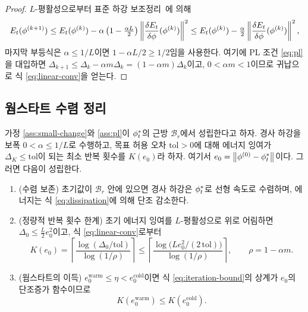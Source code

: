 \begin{proof}
$L$-평활성으로부터 표준 하강 보조정리~\citep[Lemma 1.2.3]{nesterov2004_introductory}에
의해
\[
  E_t(\phi^{(k+1)}) \le E_t(\phi^{(k)})
  - \alpha\left(1-\tfrac{\alpha L}{2}\right)\left\lVert \frac{\delta E_t}{\delta\phi}(\phi^{(k)}) \right\rVert^2
  \le E_t(\phi^{(k)}) - \tfrac{\alpha}{2}\left\lVert \frac{\delta E_t}{\delta\phi}(\phi^{(k)}) \right\rVert^2,
\]
마지막 부등식은 $\alpha\le 1/L$이면 $1-\alpha L/2 \ge 1/2$임을 사용한다. 여기에 PL
조건 \eqref{eq:pl}을 대입하면
$\Delta_{k+1} \le \Delta_k - \alpha m \Delta_k = (1-\alpha m)\Delta_k$이고,
$0<\alpha m<1$이므로 귀납으로 식 \eqref{eq:linear-conv}을 얻는다.
\end{proof}

\subsection{웜스타트 수렴 정리}

\begin{theorem}
\label{thm:warmstart}
가정 \ref{ass:small-change}와 \ref{ass:pl}이 $\phi^*_t$의 근방 $\mathcal{B}_r$에서
성립한다고 하자. 경사 하강을 보폭 $0<\alpha\le 1/L$로 수행하고, 목표 허용 오차
$\mathrm{tol}>0$에 대해 에너지 잉여가 $\Delta_K \le \mathrm{tol}$이 되는 최소 반복
횟수를 $K(e_0)$라 하자. 여기서 $e_0 = \left\lVert \phi^{(0)}-\phi^*_t \right\rVert$이다. 그러면 다음이
성립한다.
\begin{enumerate}[label=(\roman*)]
  \item (수렴 보존) 초기값이 $\mathcal{B}_r$ 안에 있으면 경사 하강은 $\phi^*_t$로
  선형 속도로 수렴하며, 에너지는 식 \eqref{eq:dissipation}에 의해 단조 감소한다.
  \item (정량적 반복 횟수 한계) 초기 에너지 잉여를 $L$-평활성으로 위로 어림하면
  $\Delta_0 \le \tfrac{L}{2}e_0^2$이고, 식 \eqref{eq:linear-conv}로부터
  \begin{equation}
    K(e_0) = \left\lceil \frac{\log(\Delta_0/\mathrm{tol})}{\log(1/\rho)} \right\rceil
    \le \left\lceil \frac{\log\bigl(L e_0^2/(2\,\mathrm{tol})\bigr)}{\log(1/\rho)} \right\rceil,
    \qquad \rho = 1-\alpha m.
    \label{eq:iteration-bound}
  \end{equation}
  \item (웜스타트의 이득) $e^{\mathrm{warm}}_0 \le \eta < e^{\mathrm{cold}}_0$이면
  식 \eqref{eq:iteration-bound}의 상계가 $e_0$의 단조증가 함수이므로
  \begin{equation}
    K(e^{\mathrm{warm}}_0) \le K(e^{\mathrm{cold}}_0).
    \label{eq:warmstart-gain}
  \end{equation}
\end{enumerate}
\end{theorem}

